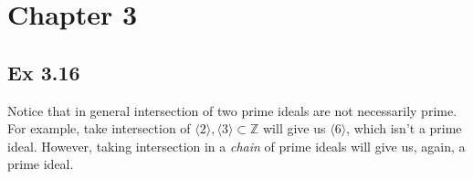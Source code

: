 \section{Chapter 3}

\subsection{Ex 3.16}
Notice that in general intersection of two prime ideals are not necessarily prime. For example, take intersection of $\langle 2\rangle,\langle 3\rangle\subset \mathbb Z$ will give us $\langle 6\rangle$, which isn't a prime ideal. However, taking intersection in a \textit{chain} of prime ideals will give us, again, a prime ideal. 